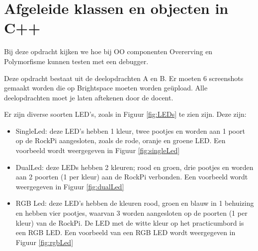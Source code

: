 \chapter{Afgeleide klassen en objecten in C++}

Bij deze opdracht kijken we hoe bij OO componenten Overerving en Polymorfisme kunnen testen met een debugger.

Deze opdracht bestaat uit de deelopdrachten A en B. Er moeten 6 screenshots gemaakt worden die op Brightspace moeten worden geüpload. Alle deelopdrachten moet je laten aftekenen door de docent.

Er zijn diverse soorten LED's, zoals in Figuur \ref{fig:LEDs} te zien zijn. Deze zijn:
\begin{itemize}
	\item SingleLed: deze LED's hebben 1 kleur, twee pootjes en worden aan 1 poort op de RockPi aangesloten, zoals de rode, oranje en groene LED. Een voorbeeld wordt weergegeven in Figuur \ref{fig:singleLed}
	\item DualLed: deze LEDs hebben 2 kleuren; rood en groen, drie pootjes en worden aan 2 poorten (1 per kleur) aan de RockPi verbonden. Een voorbeeld wordt weergegeven in Figuur \ref{fig:dualLed}
	\item RGB Led: deze LED's hebben de kleuren rood, groen en blauw in 1 behuizing en hebben vier pootjes, waarvan 3 worden aangesloten op de poorten (1 per kleur) van de RockPi. De LED met de witte kleur op het practicumbord is een RGB LED. Een voorbeeld van een RGB LED wordt weergegeven in Figuur \ref{fig:rgbLed}
\end{itemize}

